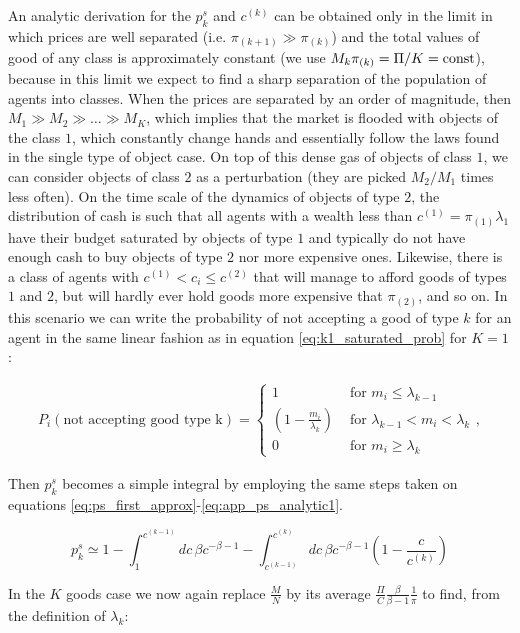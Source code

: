 An analytic derivation for the $p_k^s$ and $c^{(k)}$ can be obtained only in the limit in which prices are well separated (i.e. $\pi_{(k+1)} \gg \pi_{(k)}$) and the total values of good of any class is approximately constant (we use $M_k\pi_{(k)}  = \Pi / K = {\rm const}$), because in this limit we expect to find a sharp separation of the population of agents into classes. When the prices are separated by an order of magnitude, then $M_1\gg M_2\gg \ldots \gg M_K$, which implies that the market is flooded with objects of the class $1$, which constantly change hands and essentially follow the laws found in the single type of object case. On top of this dense gas of objects of class $1$, we can consider objects of class $2$ as a perturbation (they are picked $M_2/M_1$ times less often). On the time scale of the dynamics of objects of type $2$, the distribution of cash is such that all agents with a wealth less than $c^{(1)}=\pi_{(1)}\lambda_1$ have their budget saturated by objects of type $1$ and typically do not have enough cash to buy objects of type $2$ nor more expensive ones. 
Likewise, there is a class of agents with $c^{(1)}<c_i\le c^{(2)}$ that will manage to afford goods of types $1$ and $2$, but will hardly ever hold goods more expensive that $\pi_{(2)}$, and so on. In this scenario we can write the probability of not accepting a good of type $k$ for an agent in the same linear fashion as in equation \eqref{eq:k1_saturated_prob} for $K=1$:

\begin{align}
P_i(\text{not accepting good type k}) = 
\begin{cases}
1 & \text{ for } m_i \leq \lambda_{k-1} \\
\left( 1 - \frac{m_i}{\lambda_k} \right) & \text{ for } \lambda_{k-1} < m_i < \lambda_k \\
0 & \text{ for } m_i \geq \lambda_k
\end{cases},
\end{align}

Then $p^s_k$ becomes a simple integral by employing the same steps taken on equations \eqref{eq:ps_first_approx}-\eqref{eq:app_ps_analytic1}.

\begin{equation}
p^s_{k} \simeq 1 - \int_{1}^{c^{(k-1)}} dc\, \beta c^{-\beta - 1} - \int_{c^{(k-1)}}^{c^{(k)}} dc\, \beta c^{-\beta - 1} \left( 1 - \frac{c}{c^{(k)}} \right) 
\end{equation}

In the $K$ goods case we now again replace $\frac{M}{N}$ by its average $\frac{\Pi}{C}\frac{\beta}{\beta - 1}\frac{1}{\pi}$ to find, from the definition of $\lambda_k$:

